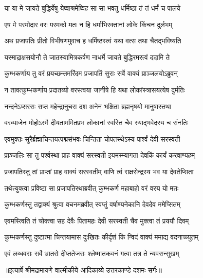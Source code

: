 \twolineshloka
{या या मे जायते बुद्धिर्येषु येष्वाश्रमेष्विह}
{सा सा भवतु धर्मिष्ठा तं तं धर्मं च पालये} %

\twolineshloka
{एष मे परमोदार वरः परमको मतः}
{न हि धर्माभिरक्तानां लोके किंचन दुर्लभम्} %

\twolineshloka
{अथ प्रजापतिः प्रीतो विभीषणमुवाच ह}
{धर्मिष्ठस्त्वं यथा वत्स तथा चैतद्भविष्यति} %

\twolineshloka
{यस्माद्राक्षसयोनौ ते जातस्यामित्रकर्षण}
{नाधर्मे जायते बुद्धिरमरत्वं ददामि ते} %

\twolineshloka
{कुम्भकर्णाय तु वरं प्रयच्छन्तमरिंदम}
{प्रजापतिं सुराः सर्वे वाक्यं प्राञ्जलयोऽब्रुवन्} %

\twolineshloka
{न तावत्कुम्भकर्णाय प्रदातव्यो वरस्त्वया}
{जानीषे हि यथा लोकांस्त्रासयत्येष दुर्मतिः} %

\twolineshloka
{नन्दनेऽप्सरसः सप्त महेन्द्रानुचरा दश}
{अनेन भक्षिता ब्रह्मनृषयो मानुषास्तथा} %

\twolineshloka
{वरव्याजेन मोहोऽस्मै दीयताममितप्रभ}
{लोकानां स्वस्ति चैव स्याद्भवेदस्य च संनतिः} %

\twolineshloka
{एवमुक्तः सुरैर्ब्रह्माचिन्तयत्पद्मसंभवः}
{चिन्तिता चोपतस्थेऽस्य पार्श्वं देवी सरस्वती} %

\twolineshloka
{प्राञ्जलिः सा तु पर्श्वस्था प्राह वाक्यं सरस्वती}
{इयमस्म्यागता देवकिं कार्यं करवाण्यहम्} %

\twolineshloka
{प्रजापतिस्तु तां प्राप्तां प्राह वाक्यं सरस्वतीम्}
{वाणि त्वं राक्षसेन्द्रस्य भव या देवतेप्सिता} %

\twolineshloka
{तथेत्युक्त्वा प्रविष्टा सा प्रजापतिरथाब्रवीत्}
{कुम्भकर्ण महाबाहो वरं वरय यो मतः} %

\twolineshloka
{कुम्भकर्णस्तु तद्वाक्यं श्रुत्वा वचनमब्रवीत्}
{स्वप्तुं वर्षाण्यनेकानि देवदेव ममेप्सितम्} %

\twolineshloka
{एवमस्त्विति तं चोक्त्वा सह देवैः पितामहः}
{देवी सरस्वती चैव मुक्त्वा तं प्रययौ दिवम्} %

\twolineshloka
{कुम्भकर्णस्तु दुष्टात्मा चिन्तयामास दुःखितः}
{कीर्दृशं किं न्विदं वाक्यं ममाद्य वदनाच्च्युतम्} %

\twolineshloka
{एवं लब्धवराः सर्वे भ्रातरो दीप्ततेजसः}
{श्लेष्मातकवनं गत्वा तत्र ते न्यवसन्सुखम्} %


{॥इत्यार्षे श्रीमद्रामायणे वाल्मीकीये आदिकाव्ये उत्तरकाण्डे दशमः सर्गः॥}


